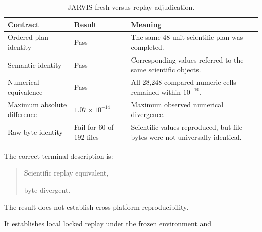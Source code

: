 \documentclass[11pt,a4paper,oneside]{report}
\begin{document}
\begin{table}[H]



\centering



\caption{JARVIS fresh-versus-replay adjudication.}



\label{tab:jarvis-replay}



\begin{tabularx}{\textwidth}{L{0.28\textwidth}
    L{0.23\textwidth}
    Y
}
\toprule
\textbf{Contract}
&
\textbf{Result}
&
\textbf{Meaning}
\\
\midrule
Ordered plan identity
&
Pass
&
The same 48-unit scientific plan was completed.
\\
\addlinespace
Semantic identity
&
Pass
&
Corresponding values referred to the same scientific objects.
\\
\addlinespace
Numerical equivalence
&
Pass
&
All 28,248 compared numeric cells remained within
$10^{-10}$.
\\
\addlinespace
Maximum absolute difference
&
$1.07\times10^{-14}$
&
Maximum observed numerical divergence.
\\
\addlinespace
Raw-byte identity
&
Fail for 60 of 192 files
&
Scientific values reproduced,
but file bytes were not universally identical.
\\
\bottomrule
\end{tabularx}



\end{table}





The correct terminal description is:



\begin{quote}



Scientific replay equivalent,

byte divergent.



\end{quote}



The result does not establish cross-platform reproducibility.



It establishes local locked replay under the frozen environment and
\end{document}

